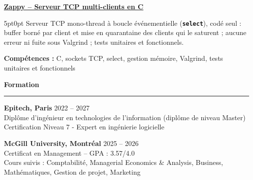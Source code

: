 \documentclass[9pt]{extarticle}
\begin{document}
\underline{\bfseries Zappy -- Serveur TCP multi-clients en C}
\par
\begin{adjustwidth}{5pt}{0pt}
    Serveur TCP mono-thread à boucle événementielle ({\bfseries \texttt{select}}), codé seul : buffer borné par client et mise en quarantaine des clients qui le saturent ; aucune erreur ni fuite sous Valgrind ; tests unitaires et fonctionnels.
\end{adjustwidth}
\par
{\bfseries Compétences :} C, sockets TCP, select, gestion mémoire, Valgrind, tests unitaires et fonctionnels

\par\vspace{8pt}

{\large\bfseries Formation}
\par\vspace{-8pt}
\rule{\linewidth}{0.4pt}
\par\vspace{5pt}

{\bfseries Epitech, Paris} \hfill 2022 -- 2027 \\
Diplôme d'ingénieur en technologies de l'information (diplôme de niveau Master) \\
Certification Niveau 7 - Expert en ingénierie logicielle

\vspace{6pt}

{\bfseries McGill University, Montréal} \hfill 2025 -- 2026 \\
Certificat en Management -- GPA : 3.57/4.0 \\
Cours suivis : Comptabilité, Managerial Economics \& Analysis, Business, Mathématiques, Gestion de projet, Marketing
\end{document}
